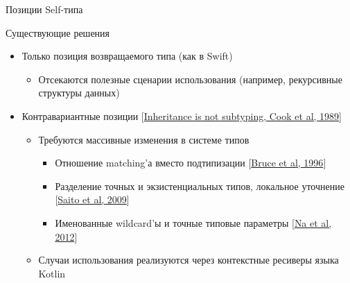 \documentclass[handout,aspectratio=169,usenames,dvipsnames]{beamer}
\begin{document}
    \begin{frame}{Позиции Self-типа}


        \begin{block}{Существующие решения}
            \begin{itemize}
                \item Только позиция возвращаемого типа (как в Swift)
                \begin{itemize}
                    \item Отсекаются полезные сценарии использования (например, рекурсивные структуры данных)
                \end{itemize}
                \item Контравариантные позиции [\href{https://dl.acm.org/doi/pdf/10.1145/96709.96721}{Inheritance is not subtyping, Cook et al, 1989}]
                \begin{itemize}
                    \item Требуются массивные изменения в системе типов
                    \begin{itemize}
                        \item Отношение matching'а вместо подтипизации [\href{https://www.researchgate.net/profile/Kim-Bruce-2/publication/221496196_Subtyping_Is_Not_a_Good_Match_for_Object-Oriented_Languages/links/09e415122545c6d7a4000000/Subtyping-Is-Not-a-Good-Match-for-Object-Oriented-Languages.pdf}{Bruce et al, 1996}]
                        \item Разделение точных и экзистенциальных типов, локальное уточнение [\href{https://citeseerx.ist.psu.edu/document?repid=rep1&type=pdf&doi=a9d601d3bf8c921748902d58078d0a1b28f6ec4d}{Saito et al, 2009}]
                        \item Именованные wildcard'ы и точные типовые параметры [\href{https://www.researchgate.net/profile/Sukyoung-Ryu/publication/254004584_Exact_type_parameterization_and_ThisType_support/links/54b90ed10cf269d8cbf72d01/Exact-type-parameterization-and-ThisType-support.pdf}{Na et al, 2012}]
                    \end{itemize}
                    \item Случаи использования реализуются через контекстные ресиверы языка Kotlin
                \end{itemize}
            \end{itemize}
        \end{block}


\end{frame}
\end{document}
